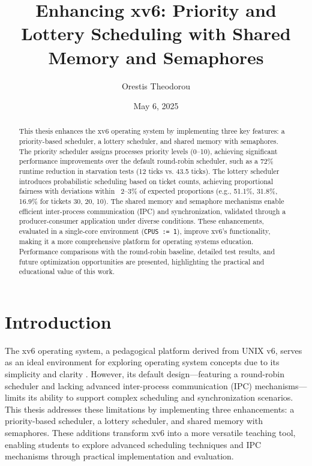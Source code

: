 \documentclass[12pt]{article}
\begin{document}
\title{Enhancing xv6: Priority and Lottery Scheduling with Shared Memory and Semaphores}
\author{Orestis Theodorou}
\date{May 6, 2025}
\maketitle

\begin{abstract}
This thesis enhances the xv6 operating system by implementing three key features: a priority-based scheduler, a lottery scheduler, and shared memory with semaphores. The priority scheduler assigns processes priority levels (0–10), achieving significant performance improvements over the default round-robin scheduler, such as a 72\% runtime reduction in starvation tests (12 ticks vs. 43.5 ticks). The lottery scheduler introduces probabilistic scheduling based on ticket counts, achieving proportional fairness with deviations within ~2–3\% of expected proportions (e.g., 51.1\%, 31.8\%, 16.9\% for tickets 30, 20, 10). The shared memory and semaphore mechanisms enable efficient inter-process communication (IPC) and synchronization, validated through a producer-consumer application under diverse conditions. These enhancements, evaluated in a single-core environment (\texttt{CPUS := 1}), improve xv6’s functionality, making it a more comprehensive platform for operating systems education. Performance comparisons with the round-robin baseline, detailed test results, and future optimization opportunities are presented, highlighting the practical and educational value of this work.
\end{abstract}

\tableofcontents
\newpage

\section{Introduction}
\label{sec:introduction}

The xv6 operating system, a pedagogical platform derived from UNIX v6, serves as an ideal environment for exploring operating system concepts due to its simplicity and clarity \cite{xv6}. However, its default design—featuring a round-robin scheduler and lacking advanced inter-process communication (IPC) mechanisms—limits its ability to support complex scheduling and synchronization scenarios. This thesis addresses these limitations by implementing three enhancements: a priority-based scheduler, a lottery scheduler, and shared memory with semaphores. These additions transform xv6 into a more versatile teaching tool, enabling students to explore advanced scheduling techniques and IPC mechanisms through practical implementation and evaluation.
\end{document}
